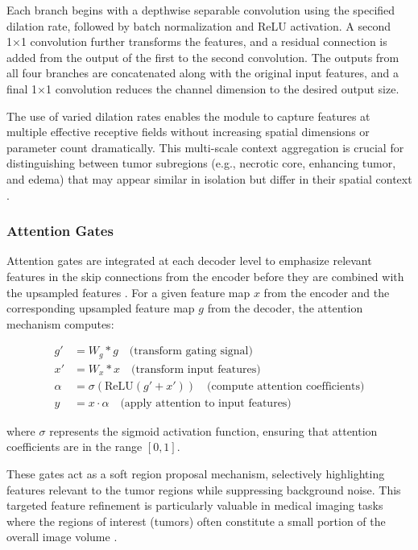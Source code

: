 \documentclass[12pt,a4paper]{article}
\begin{document}
Each branch begins with a depthwise separable convolution using the specified dilation rate, followed by batch normalization and ReLU activation. A second 1×1 convolution further transforms the features, and a residual connection is added from the output of the first to the second convolution. The outputs from all four branches are concatenated along with the original input features, and a final 1×1 convolution reduces the channel dimension to the desired output size.

The use of varied dilation rates enables the module to capture features at multiple effective receptive fields without increasing spatial dimensions or parameter count dramatically. This multi-scale context aggregation is crucial for distinguishing between tumor subregions (e.g., necrotic core, enhancing tumor, and edema) that may appear similar in isolation but differ in their spatial context \cite{Chen2018ASPP}.

\subsubsection{Attention Gates}

Attention gates are integrated at each decoder level to emphasize relevant features in the skip connections from the encoder before they are combined with the upsampled features \cite{Rehman2023RAAGR2, Oktay2018AttentionUNet}. For a given feature map $x$ from the encoder and the corresponding upsampled feature map $g$ from the decoder, the attention mechanism computes:

\begin{align}
g' &= W_g * g \quad \textrm{(transform gating signal)} \\
x' &= W_x * x \quad \textrm{(transform input features)} \\
\alpha &= \sigma(\textrm{ReLU}(g' + x')) \quad \textrm{(compute attention coefficients)} \\
y &= x \cdot \alpha \quad \textrm{(apply attention to input features)}
\end{align}

where $\sigma$ represents the sigmoid activation function, ensuring that attention coefficients are in the range $[0,1]$.

These gates act as a soft region proposal mechanism, selectively highlighting features relevant to the tumor regions while suppressing background noise. This targeted feature refinement is particularly valuable in medical imaging tasks where the regions of interest (tumors) often constitute a small portion of the overall image volume \cite{Oktay2018AttentionUNet}.
\end{document}

